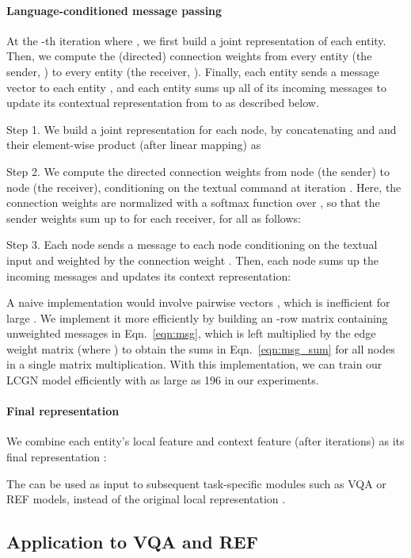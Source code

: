 \documentclass[10pt,twocolumn,letterpaper]{article}
\begin{document}
\vspace{-1em}
\paragraph{Language-conditioned message passing} At the -th iteration where , we first build a joint representation of each entity. Then, we compute the (directed) connection weights  from every entity  (the sender, ) to every entity  (the receiver, ). Finally, each entity  sends a message vector  to each entity , and each entity  sums up all of its incoming messages  to update its contextual representation from  to  as described below.

Step 1. We build a joint representation  for each node, by concatenating  and  and their element-wise product (after linear mapping) as


Step 2. We compute the directed connection weights  from node  (the sender) to node  (the receiver), conditioning on the textual command  at iteration . Here, the connection weights are normalized with a softmax function over , so that the sender weights sum up to  for each receiver, \ie  for all  as follows:


Step 3. Each node  sends a message  to each node  conditioning on the textual input  and weighted by the connection weight . Then, each node  sums up the incoming messages and updates its context representation:


A naive implementation would involve  pairwise vectors , which is inefficient for large . We implement it more efficiently by building an -row matrix  containing  unweighted messages  in Eqn.~\ref{eqn:msg}, which is left multiplied by the edge weight matrix  (where ) to obtain the sums  in Eqn.~\ref{eqn:msg_sum} for all nodes in a single matrix multiplication. With this implementation, we can train our LCGN model efficiently with  as large as 196 in our experiments.

\vspace{-1em}
\paragraph{Final representation} We combine each entity's local feature  and context feature  (after  iterations) as its final representation :


The  can be used as input to subsequent task-specific modules such as VQA or REF models, instead of the original local representation .

\subsection{Application to VQA and REF}
\label{sec:method_app}
\end{document}

